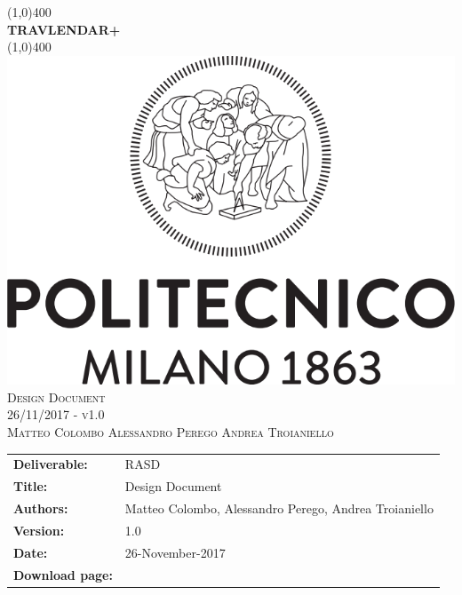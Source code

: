 
\usepackage{float}
\usepackage[section]{placeins}


\begin{titlepage}
	\begin{center}
		\line(1,0){400}\\	[0.6cm]
		\Huge{\bfseries{TRAVLENDAR+}}\\
		\line(1,0){400}\\
		[3cm]
		\includegraphics[scale=0.3]{Images/polimi}\\
		[3cm]
		\textsc{\Huge Design Document}\\[1cm]
		\textsc{\huge 26/11/2017 - v1.0}\\
		[4cm]
		\textsc{\normalsize Matteo Colombo \hspace{0.4cm} Alessandro Perego \hspace{0.4cm} Andrea Troianiello }
	\end{center}
\end{titlepage}
	
\begin{table}[h!]
\begin{tabu} to \textwidth { X[0.3,r,p] X[0.7,l,p] }
\hline

\textbf{Deliverable:} & RASD\\
\textbf{Title:} & Design Document \\
\textbf{Authors:} & Matteo Colombo, Alessandro Perego, Andrea Troianiello \\
\textbf{Version:} & 1.0 \\ 
\textbf{Date:} & 26-November-2017 \\
\textbf{Download page:} & \href{https://github.com/MatteoColombo/ColomboPeregoTroianiello}{\color{Black}{GitHub - ColomboPeregoTroianiello repository}} \\
\hline
\end{tabu}
\end{table}

